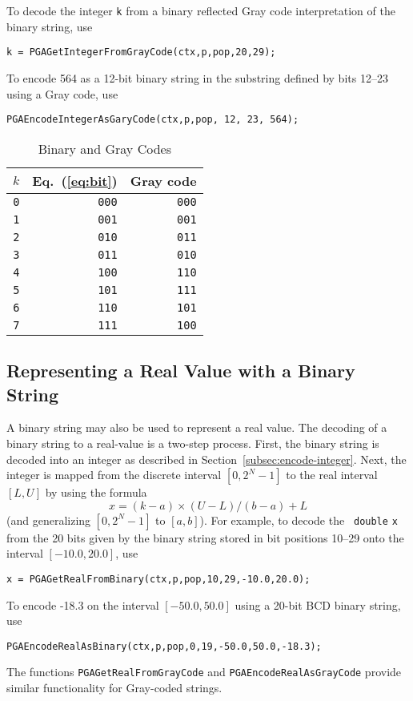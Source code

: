 \documentclass{report}
\begin{document}
To decode the integer {\tt k} from a binary reflected Gray code
interpretation of the binary string, use
\begin{verbatim}
k = PGAGetIntegerFromGrayCode(ctx,p,pop,20,29);
\end{verbatim}
To encode 564 as a 12-bit binary string in the substring defined by bits 12--23 using a Gray code, use
\begin{verbatim}
PGAEncodeIntegerAsGaryCode(ctx,p,pop, 12, 23, 564);
\end{verbatim}



\begin{table}
\centering
\caption
{
Binary and Gray Codes\label{tab:gray-code}
}
\begin{tabular}{|r|r|r|} \hline\hline
    $k$ &      Eq.~(\ref{eq:bit}) &    Gray code \\  \hline
{\tt 0} &        {\tt 000} &         {\tt 000} \\
{\tt 1} &        {\tt 001} &         {\tt 001} \\
{\tt 2} &        {\tt 010} &         {\tt 011} \\
{\tt 3} &        {\tt 011} &         {\tt 010} \\
{\tt 4} &        {\tt 100} &         {\tt 110} \\
{\tt 5} &        {\tt 101} &         {\tt 111} \\
{\tt 6} &        {\tt 110} &         {\tt 101} \\
{\tt 7} &        {\tt 111} &         {\tt 100} \\ \hline
\end{tabular}
\end{table}

\subsection{Representing a Real Value with a Binary String}
\label{subsec:encode-real}

A binary string may also be used to represent a real value.  The decoding of a
binary string to a real-value is a two-step process.  First, the binary string
is decoded into an integer as described in
Section~\ref{subsec:encode-integer}.  Next, the integer is mapped from the
discrete interval $[0,2^{N}-1]$ to the real interval $[L,U]$ by using the
formula
\begin{displaymath}
x = (k-a) \times (U-L)/(b-a) + L
\end{displaymath}
(and generalizing $[0,2^{N}-1]$ to $[a,b]$).  For example, to decode the {\tt
double} {\tt x} from the 20 bits given by the binary string stored in bit
positions 10--29 onto the interval $[-10.0,20.0]$, use
\begin{verbatim}
x = PGAGetRealFromBinary(ctx,p,pop,10,29,-10.0,20.0);
\end{verbatim}
To encode -18.3 on the interval $[-50.0,50.0]$
using a 20-bit BCD binary string, use
\begin{verbatim}
PGAEncodeRealAsBinary(ctx,p,pop,0,19,-50.0,50.0,-18.3);
\end{verbatim}
The functions {\tt PGAGetRealFromGrayCode} and 
{\tt PGAEncodeRealAsGrayCode} provide similar functionality for Gray-coded
strings.
\end{document}
